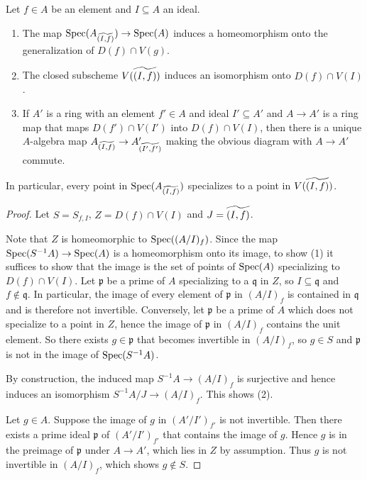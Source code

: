 \begin{lemma}[{\stacksproject{096V}}]
    \label{lemma:locally-closed-specializations}
    Let $f \in A$ be an element and $I \subseteq A$ an ideal.
    \begin{enumerate}
        \item The map $\mathrm{Spec}(A_{\widetilde{(I, f)}}) \to \mathrm{Spec}(A)$ induces
            a homeomorphism onto the generalization of $D(f) \cap V(g)$.
        \item The closed subscheme $V(\widetilde{(I, f)})$ induces an isomorphism
            onto $D(f) \cap V(I)$.
            \label{item:closed-subscheme-tilde}
        \item If $A'$ is a ring with an element $f' \in A$ and ideal $I' \subseteq A'$ and
            $A \to A'$ is a ring map that maps
            $D(f') \cap V(I')$ into $D(f) \cap V(I)$, then there is a unique $A$-algebra map
            $A_{\widetilde{(I, f)}} \to A'_{\widetilde{(I', f')}}$ making the obvious
            diagram with $A \to A'$ commute.
    \end{enumerate}
    In particular, every
    point in $\mathrm{Spec}(A_{\widetilde{(I, f)}})$ specializes to a point in $V(\widetilde{(I, f)})$.
\end{lemma}

\begin{proof}
    Let $S = S_{f, I}$, $Z = D(f) \cap V(I)$ and $J = \widetilde{(I, f)}$.

    Note that $Z$ is homeomorphic to $\mathrm{Spec}((A/I)_f)$.
    Since the map $\mathrm{Spec}(S^{-1}A) \to \mathrm{Spec}(A)$ is a homeomorphism onto its image, to show (1)
    it suffices to show that the image is the set of points of $\mathrm{Spec}(A)$ specializing to $D(f) \cap V(I)$.
    Let $\mathfrak{p}$ be a prime of $A$ specializing to a $\mathfrak{q}$ in $Z$,
    so $I \subseteq \mathfrak{q}$ and $f \not\in \mathfrak{q}$. In particular, the image
    of every element of $\mathfrak{p}$ in $(A / I)_f$ is contained in $\mathfrak{q}$ and
    is therefore not invertible.
    Conversely, let $\mathfrak{p}$ be a prime of $A$ which does not specialize to a point in
    $Z$, hence
    the image of $\mathfrak{p}$ in $(A/I)_f$ contains the unit element. So there exists
    $g \in \mathfrak{p}$ that becomes invertible in $(A / I)_f$, so $g \in S$ and
    $\mathfrak{p}$ is not in the image of $\mathrm{Spec}(S^{-1} A)$.

    By construction, the induced map $S^{-1}A \to (A / I)_f$ is surjective and hence
    induces an isomorphism $S^{-1}A / J \to (A / I)_f$. This shows (2).

    Let $g \in A$. Suppose the image of $g$ in $(A' / I')_{f'}$ is not invertible.
    Then there exists a prime ideal $\mathfrak{p}$ of $(A' / I')_{f'}$ that contains the image of $g$.
    Hence $g$ is in the preimage of $\mathfrak{p}$ under $A \to A'$, which lies in $Z$ by assumption. Thus
    $g$ is not invertible in $(A / I)_f$, which shows $g \not\in S$.
\end{proof}

